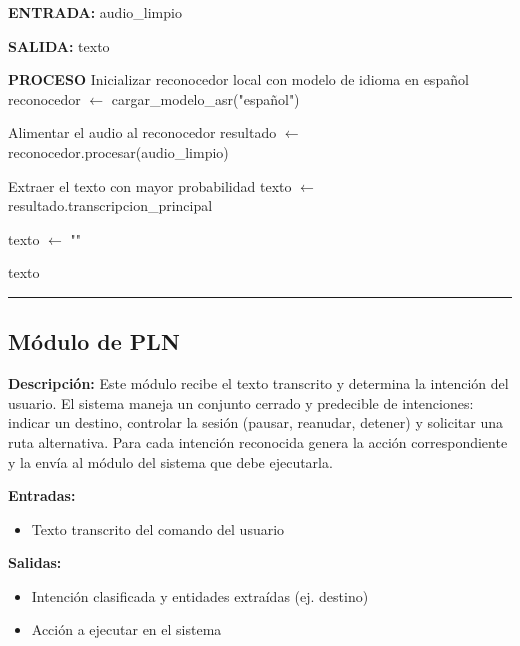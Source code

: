 \begin{algorithmic}[1]

\Statex \textbf{ENTRADA:}
\Statex audio\_limpio 

\Statex
\Statex \textbf{SALIDA:}
\Statex texto 

\Statex
\Statex \textbf{PROCESO}
\State Inicializar reconocedor local con modelo de idioma en español
\State reconocedor $\gets$ cargar\_modelo\_asr("español")

\Statex
\State Alimentar el audio al reconocedor
\State resultado $\gets$ reconocedor.procesar(audio\_limpio)

\Statex
\State Extraer el texto con mayor probabilidad
\State texto $\gets$ resultado.transcripcion\_principal

\Statex
{}

    \State texto $\gets$ "" 

\EndIf

\Statex
\State \Return texto

\end{algorithmic}
\vspace{-0.9cm}
\rule{\textwidth}{0.4pt}

\subsection{Módulo de PLN}

\textbf{Descripción:}
Este módulo recibe el texto transcrito y determina la intención del usuario. El sistema
maneja un conjunto cerrado y predecible de intenciones: indicar un destino, controlar
la sesión (pausar, reanudar, detener) y solicitar una ruta alternativa. Para cada
intención reconocida genera la acción correspondiente y la envía al módulo del sistema
que debe ejecutarla.

\textbf{Entradas:}
\begin{itemize}
    \item Texto transcrito del comando del usuario
\end{itemize}

\textbf{Salidas:}
\begin{itemize}
    \item Intención clasificada y entidades extraídas (ej. destino)
    \item Acción a ejecutar en el sistema
\end{itemize}

